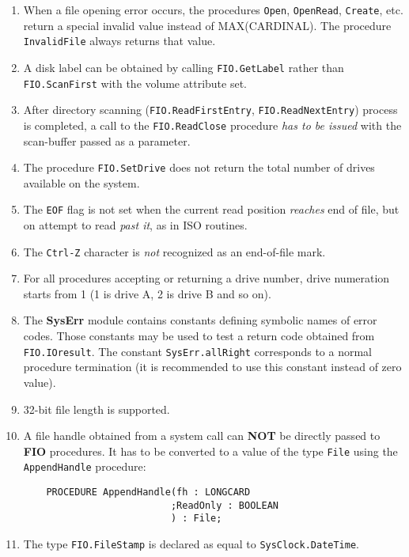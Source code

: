 \begin{enumerate}
\item When a file opening error occurs, the procedures \verb'Open', \verb'OpenRead',
      \verb'Create', etc. return a special invalid value instead of MAX(CARDINAL).
      The procedure \verb'InvalidFile' always returns that value.

\item A disk label can be obtained by calling \verb'FIO.GetLabel' rather
      than \verb'FIO.ScanFirst' with the volume attribute set.

\item After directory scanning (\verb'FIO.ReadFirstEntry', \verb'FIO.ReadNextEntry') process
      is completed, a call to the \verb'FIO.ReadClose' procedure {\em has to be issued} with
      the scan-buffer passed as a parameter.

\item The procedure \verb'FIO.SetDrive' does not return the total number of drives
      available on the system.

\item The \verb'EOF' flag is not set when the current read position {\it reaches} end of file,
      but on attempt to read {\it past it}, as in ISO routines.

\item The \verb'Ctrl-Z' character is {\it not} recognized as an end-of-file mark.

\item For all procedures accepting or returning a drive number, drive numeration
      starts from 1 (1 is drive A, 2 is drive B and so on).

\item The {\bf SysErr} module contains constants defining symbolic names of error
      codes. Those constants may be used to test a return code obtained from
      \verb'FIO.IOresult'. The constant \verb'SysErr.allRight' corresponds to a normal
      procedure termination (it is recommended to use this constant instead of
      zero value).

\item 32-bit file length is supported.

\item A file handle obtained from a system call can {\bf NOT} be directly passed
      to {\bf FIO} procedures. It has to be converted to a value of the type \verb'File'
      using the \verb'AppendHandle' procedure:

\begin{verbatim}
    PROCEDURE AppendHandle(fh : LONGCARD
                          ;ReadOnly : BOOLEAN
                          ) : File;
\end{verbatim}

\item The type \verb'FIO.FileStamp' is declared as equal to 
      \verb'SysClock.DateTime'.

\end{enumerate}


